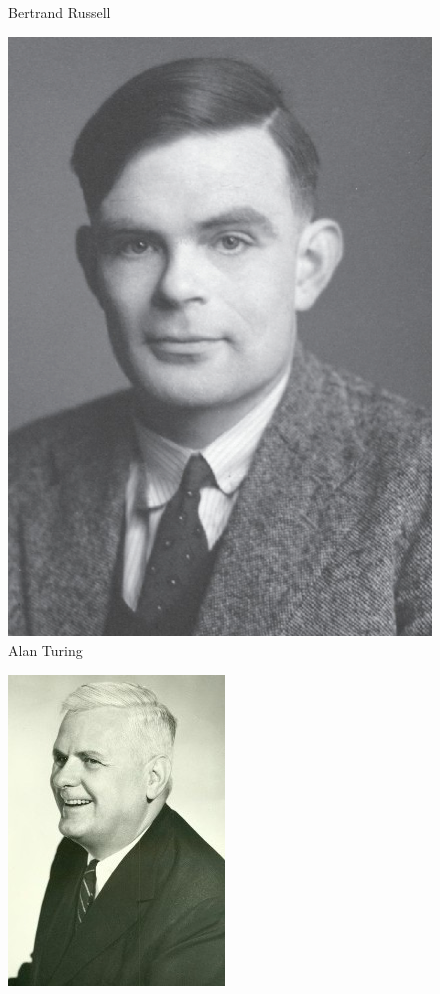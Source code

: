 \documentclass[
	aspectratio=169, %
	8pt, %
]{beamer}
\begin{document}
\begin{frame}{\insertsubsection}
\begin{fancycolumns}[columns=4]
\begin{figure}
									\caption{Bertrand Russell}
							\end{figure}
			\nextcolumn
							\begin{figure}
									\centering\includegraphics[width=.75\linewidth]{images/Alan_Turing}
									\caption{Alan Turing}
							\end{figure}
			\nextcolumn
							\begin{figure}
									\centering\includegraphics[width=.75\linewidth]{images/Alonzo_Church}

\end{figure}
\end{fancycolumns}
\end{frame}
\end{document}
